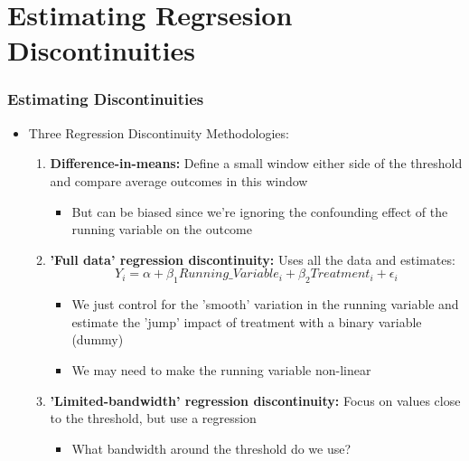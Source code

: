 \documentclass[xcolor=x11names,compress]{beamer}\usepackage[]{graphicx}\usepackage[]{color}
\renewcommand{\(}{\begin{columns}}
\renewcommand{\)}{\end{columns}}
\newcommand{\<}[1]{\begin{column}{#1}}
\renewcommand{\>}{\end{column}}
\begin{document}
\section{Estimating Regrsesion Discontinuities}

\begin{frame}
\frametitle{Estimating Discontinuities}
\begin{itemize}
\item Three Regression Discontinuity Methodologies:
\begin{enumerate}
\item \textbf{Difference-in-means:} Define a small window either side of the threshold and compare average outcomes in this window
\begin{itemize}
\item But can be biased since we're ignoring the confounding effect of the running variable on the outcome
\pause
\end{itemize}
\item \textbf{'Full data' regression discontinuity:} Uses all the data and estimates:
$$Y_i = \alpha + \beta_1 Running\_Variable_i + \beta_2 Treatment_i + \epsilon_i$$
\begin{itemize}
\item We just control for the 'smooth' variation in the running variable and estimate the 'jump' impact of treatment with a binary variable (dummy)
\item We may need to make the running variable non-linear
\pause
\end{itemize}
\item \textbf{'Limited-bandwidth' regression discontinuity:} Focus on values close to the threshold, but use a regression
\begin{itemize}
\item What bandwidth around the threshold do we use?
\end{itemize}
\end{enumerate}
\end{itemize}
\end{frame}
\end{document}
